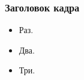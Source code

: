 \documentclass[10pt,pdf,hyperref={unicode},aspectratio=169]{beamer}
\begin{document}
\begin{frame}
\frametitle{Заголовок кадра}
\begin{itemize}
\item<1->Раз.
\item<2->Два.
\item<3->Три.
\end{itemize}
\end{frame}
\end{document}
